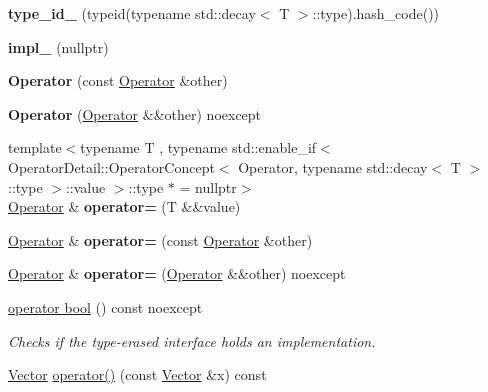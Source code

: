 \begin{DoxyCompactItemize}
\item 
\hypertarget{classSpacy_1_1Operator_a2220ff5ff7316013148fd595f698f352}{{\bfseries type\-\_\-id\-\_\-} (typeid(typename std\-::decay$<$ \-T $>$\-::type).hash\-\_\-code())}\label{classSpacy_1_1Operator_a2220ff5ff7316013148fd595f698f352}

\item 
\hypertarget{classSpacy_1_1Operator_ae82026d2695834fc30e3fb153fef184f}{{\bfseries impl\-\_\-} (nullptr)}\label{classSpacy_1_1Operator_ae82026d2695834fc30e3fb153fef184f}

\item 
\hypertarget{classSpacy_1_1Operator_aba5b330a895d246b45dfdf99630e8a95}{{\bfseries \-Operator} (const \hyperlink{classSpacy_1_1Operator}{\-Operator} \&other)}\label{classSpacy_1_1Operator_aba5b330a895d246b45dfdf99630e8a95}

\item 
\hypertarget{classSpacy_1_1Operator_ae16ebffeb1fa15d39a271b91eab7f749}{{\bfseries \-Operator} (\hyperlink{classSpacy_1_1Operator}{\-Operator} \&\&other) noexcept}\label{classSpacy_1_1Operator_ae16ebffeb1fa15d39a271b91eab7f749}

\item 
\hypertarget{classSpacy_1_1Operator_a05ad03a9a9f680740872ebcd580823df}{{\footnotesize template$<$typename T , typename std\-::enable\-\_\-if$<$ Operator\-Detail\-::\-Operator\-Concept$<$ Operator, typename std\-::decay$<$ T $>$\-::type $>$\-::value $>$\-::type $\ast$  = nullptr$>$ }\\\hyperlink{classSpacy_1_1Operator}{\-Operator} \& {\bfseries operator=} (\-T \&\&value)}\label{classSpacy_1_1Operator_a05ad03a9a9f680740872ebcd580823df}

\item 
\hypertarget{classSpacy_1_1Operator_a4231c7a32288c49b3b3905e8588f440e}{\hyperlink{classSpacy_1_1Operator}{\-Operator} \& {\bfseries operator=} (const \hyperlink{classSpacy_1_1Operator}{\-Operator} \&other)}\label{classSpacy_1_1Operator_a4231c7a32288c49b3b3905e8588f440e}

\item 
\hypertarget{classSpacy_1_1Operator_a892a5bad4d03ed24fded8c0c31daac31}{\hyperlink{classSpacy_1_1Operator}{\-Operator} \& {\bfseries operator=} (\hyperlink{classSpacy_1_1Operator}{\-Operator} \&\&other) noexcept}\label{classSpacy_1_1Operator_a892a5bad4d03ed24fded8c0c31daac31}

\item 
\hyperlink{classSpacy_1_1Operator_a001d31b07dd53fab2d0681cb8d6c9f6f}{operator bool} () const noexcept
\begin{DoxyCompactList}\small\item\em \-Checks if the type-\/erased interface holds an implementation. \end{DoxyCompactList}\item 
\hypertarget{classSpacy_1_1Operator_a2ab6072d6f9d98e0d5590531c080e3ad}{\hyperlink{classSpacy_1_1Vector}{\-Vector} \hyperlink{classSpacy_1_1Operator_a2ab6072d6f9d98e0d5590531c080e3ad}{operator()} (const \hyperlink{classSpacy_1_1Vector}{\-Vector} \&x) const }\label{classSpacy_1_1Operator_a2ab6072d6f9d98e0d5590531c080e3ad}


\end{DoxyCompactItemize}
